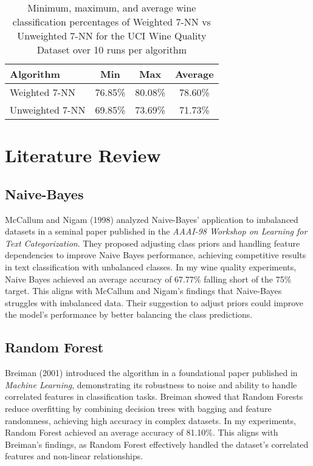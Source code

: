 \documentclass{article}
\theoremstyle{plain}
\theoremstyle{definition}
\theoremstyle{remark}
\begin{document}
\begin{table}[H]
\centering
\begin{tabular}{lccc}
\toprule
Algorithm & Min & Max & Average \\
\midrule
Weighted 7-NN & 76.85\% & 80.08\% & 78.60\% \\
Unweighted 7-NN & 69.85\% & 73.69\% & 71.73\% \\
\bottomrule
\end{tabular}
\caption{Minimum, maximum, and average wine classification  percentages of Weighted 7-NN vs Unweighted 7-NN for the UCI Wine Quality Dataset over 10 runs per algorithm}
\end{table}


\section{Literature Review}

\subsection{Naive-Bayes}

McCallum and Nigam (1998) analyzed Naive-Bayes' application to imbalanced datasets in a seminal paper published in the \textit{AAAI-98 Workshop on Learning for Text Categorization}. They proposed adjusting class priors and handling feature dependencies to improve Naive Bayes performance, achieving competitive results in text classification with unbalanced classes. In my wine quality experiments, Naive Bayes achieved an average accuracy of 67.77\% falling short of the 75\% target. This aligns with McCallum and Nigam’s findings that Naive-Bayes struggles with imbalanced data. Their suggestion to adjust priors could improve the model's performance by better balancing the class predictions.


\subsection{Random Forest}

Breiman (2001) introduced the algorithm in a foundational paper published in \textit{Machine Learning}, demonstrating its robustness to noise and ability to handle correlated features in classification tasks. Breiman showed that Random Forests reduce overfitting by combining decision trees with bagging and feature randomness, achieving high accuracy in complex datasets. In my experiments, Random Forest achieved an average accuracy of 81.10\%. This aligns with Breiman’s findings, as Random Forest effectively handled the dataset’s correlated features and non-linear relationships.
\end{document}
